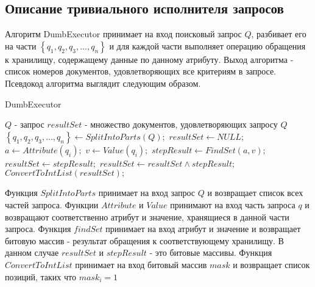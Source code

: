 \documentclass{matmex-diploma}
\begin{document}
    \subsection{Описание тривиального исполнителя запросов}
        Алгоритм DumbExecutor принимает на вход поисковый запрос $Q$, разбивает его на части $\left\{ q_1, q_2, q_3, ... , q_n \right\} $ и для каждой части выполняет операцию обращения к хранилищу, содержащему данные по данному атрибуту. Выход алгоритма - список номеров документов, удовлетворяющих все критериям в запросе. Псевдокод алгоритма выглядит следующим образом.
        \begin{algorithm}                   
        \caption{DumbExecutor}              
        \label{dumb}                        
            \begin{algorithmic}        
                \REQUIRE $Q$ - запрос
                \ENSURE $resultSet$ - множество документов, удовлетворяющих запросу $Q$
                \STATE $\left\{ q_1, q_2, q_3, ... , q_n \right\} \leftarrow SplitIntoParts(Q);$
                \STATE $resultSet \leftarrow NULL;$
                    \STATE $a \leftarrow Attribute(q_i);$
                    \STATE $v \leftarrow Value(q_i);$
                    \STATE $stepResult \leftarrow FindSet(a, v);$
                        \STATE $resultSet \leftarrow stepResult;$
                    \ENDIF
                    \STATE $resultSet \leftarrow resultSet \land stepResult;$
                \ENDFOR
                \RETURN $ConvertToIntList(resultSet);$
            \end{algorithmic}
        \end{algorithm}
        
        Функция $SplitIntoParts$ принимает на вход запрос $Q$ и возвращает список всех частей запроса. Функции $Attribute$ и $Value$ принимают на вход часть запроса $q$ и возвращают соответственно атрибут и значение, хранящиеся в данной части запроса. Функция $findSet$ принимает на вход атрибут и значение и возвращает битовую массив - результат обращения к соответствующему хранилищу. В данном случае $resultSet $ и $stepResult$ - это битовые массивы. Функция $ConvertToIntList$ принимает на вход битовый массив $mask$ и возвращает список позиций, таких что $mask_i = 1$ 
        
\end{document}
